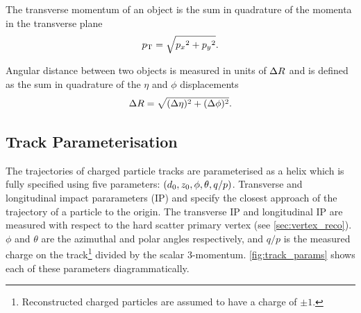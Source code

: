 The transverse momentum \pt of an object is the sum in quadrature of the momenta in the transverse plane
%
\begin{equation}\label{eq:pt}
  p_{\text{T}} = \sqrt{ {p_x}^2 + {p_y}^2 } .
\end{equation}

Angular distance between two objects is measured in units of $\Delta R$ and is defined as the sum in quadrature of the $\eta$ and $\phi$ displacements
%
\begin{equation}\label{eq:delta_r}
  \Delta R = \sqrt{(\Delta\eta)^{2} + (\Delta\phi)^{2}} .
\end{equation}
%



\subsection{Track Parameterisation}\label{sec:track_parameterisation}

The trajectories of charged particle tracks are parameterised as a helix which is fully specified using five parameters: $(d_{0}, z_{0}, \phi, \theta, q/p)$.
Transverse and longitudinal impact pararameters (IP) \dzero and \zzero specify the closest approach of the trajectory of a particle to the origin.
The transverse IP \dzero and longitudinal IP \zzero are measured with respect to the hard scatter primary vertex (see \cref{sec:vertex_reco}).
$\phi$ and $\theta$ are the azimuthal and polar angles respectively, and $q/p$ is the measured charge on the track\footnote{Reconstructed charged particles are assumed to have a charge of $\pm 1$.} divided by the scalar 3-momentum.
\cref{fig:track_params} shows each of these parameters diagrammatically.

